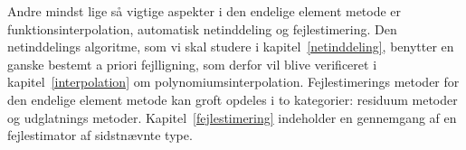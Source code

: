 Andre mindst lige så vigtige aspekter i den endelige element metode er
funktionsinterpolation, automatisk netinddeling og fejlestimering.
Den netinddelings algoritme, som vi skal studere i
kapitel~\ref{netinddeling}, benytter en ganske
bestemt a priori fejlligning, som derfor vil blive verificeret i
kapitel~\ref{interpolation} om polynomiumsinterpolation. Fejlestimerings
metoder for den endelige element metode kan groft opdeles i to
kategorier: residuum metoder og udglatnings metoder.
Kapitel~\ref{fejlestimering} indeholder en gennemgang af en
fejlestimator af sidstnævnte type.
